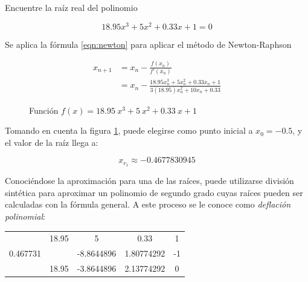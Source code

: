 \begin{ex}
    Encuentre la raíz real del polinomio 

    \[
        18.95x^3 + 5x^2  + 0.33x + 1 = 0
    \]

    \begin{solution}
        Se aplica la fórmula \ref{eqn:newton} para aplicar el método de
        Newton-Raphson

        \begin{align*}
            x_{n+1} &= x_n - \frac{f(x_n)}{f'(x_n)} \\
                &= x_n - \frac{18.95x_n^3 + 5x_n^2 + 0.33x_n +
                1}{3(18.95)x_n^2 + 10x_n + 0.33}
        \end{align*}

        \begin{figure}
            \centering
            \caption{Función $f(x) = 18.95\ x^3 + 5\ x^2 + 0.33\ x + 1$}
            \label{fig:ejercicio-newton-2}
        \end{figure}

        Tomando en cuenta la figura \ref{fig:ejercicio-newton-2}, puede
        elegirse como punto inicial a \(x_0 = -0.5 \), y el valor de la raíz
        llega a:

        \[
            \boxed{x_{r_1} \approx -0.4677830945}
        \]

        Conociéndose la aproximación para una de las raíces, puede utilizarse
        división sintética para aproximar un polinomio de segundo grado cuyas
        raíces pueden ser calculadas con la fórmula general. A este proceso se
        le conoce como \textit{deflación polinomial}:

        \begin{center}
            \begin{tabular}{ c | c c c c }
                & 18.95 & 5 & 0.33 & 1 \\
                    0.467731 & & -8.8644896 & 1.80774292 & -1 \\
             \hline
                 & 18.95 & -3.8644896 & 2.13774292 & 0
            \end{tabular}
        \end{center}


\end{solution}
\end{ex}
